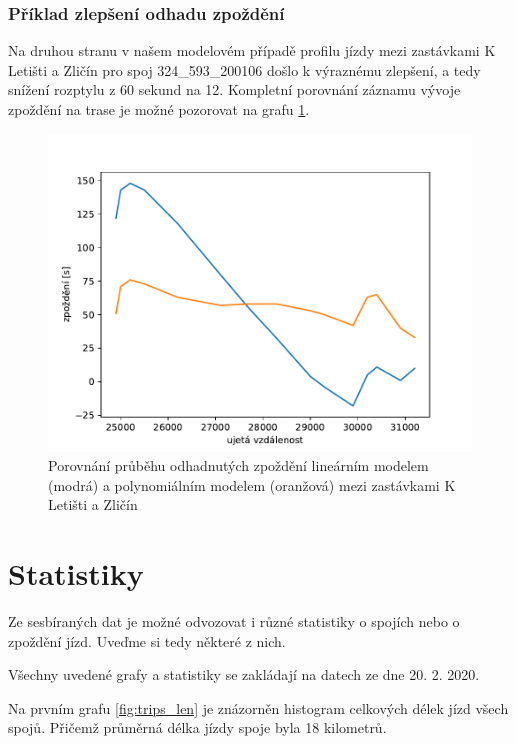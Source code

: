 \subsubsection{Příklad zlepšení odhadu zpoždění}


Na druhou stranu v našem modelovém případě profilu jízdy mezi zastávkami K Letišti a Zličín pro spoj 324\_593\_200106 došlo k výraznému zlepšení, a tedy snížení rozptylu z 60 sekund na 12. Kompletní porovnání záznamu vývoje zpoždění na trase je možné pozorovat na grafu \ref{fig:compare_534_421}.


\begin{figure}
   \centering
 \includegraphics[width=1\linewidth]{../img/compare_534_421}
 \caption{Porovnání průběhu odhadnutých zpoždění lineárním modelem (modrá) a polynomiálním modelem (oranžová) mezi zastávkami K Letišti a Zličín}
 \label{fig:compare_534_421}
\end{figure}


\section{Statistiky} \label{section:stats}


Ze sesbíraných dat je možné odvozovat i různé statistiky o spojích nebo o zpoždění jízd. Uveďme si tedy některé z nich.


\bigbreak


Všechny uvedené grafy a statistiky se zakládají na datech ze dne 20. 2. 2020.


\bigbreak


Na prvním grafu \ref{fig:trips_len} je znázorněn histogram celkových délek jízd všech spojů. Přičemž průměrná délka jízdy spoje byla 18 kilometrů.


